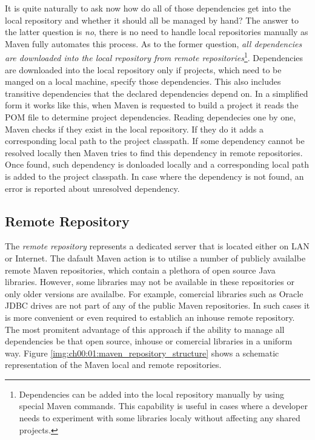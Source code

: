   It is quite naturally to ask now how do all of those dependencies get into the local repository and whether it should all be managed by hand?
  The answer to the latter question is \emph{no}, there is no need to handle local repositories manually as Maven fully automates this process.
  As to the former question, \emph{all dependencies are downloaded into the local repository from remote repositories}\footnote{
    Dependencies can be added into the local repository manually by using special Maven commands. 
    This capability is useful in cases where a developer needs to experiment with some libraries localy without affecting any shared projects.
  }.
  Dependencies are downloaded into the local repository only if projects, which need to be manged on a local machine, specify those dependencies.
  This also includes transitive dependencies that the declared dependencies depend on.
  In a simplified form it works like this, when Maven is requested to build a project it reads the POM file to determine project dependencies.
  Reading dependecies one by one, Maven checks if they exist in the local repository.
  If they do it adds a corresponding local path to the project classpath.
  If some dependency cannot be resolved locally then Maven tries to find this dependency in remote repositories.
  Once found, such dependency is donloaded locally and a corresponding local path is added to the project classpath.
  In case where the dependency is not found, an error is reported about unresolved dependency.

  \subsection*{Remote Repository}
  
  The \emph{remote repository} represents a dedicated server that is located either on LAN or Internet.
  The dafault Maven action is to utilise a number of publicly availalbe remote Maven repositories, which contain a plethora of open source Java libraries.
  However, some libraries may not be available in these repositories or only older versions are availalbe.
  For example, comercial libraries such as Oracle JDBC drives are not part of any of the public Maven repositories.
  In such cases it is more convenient or even required to establich an inhouse remote repository.
  The most promitent advantage of this approach if the ability to manage all dependencies be that open source, inhouse or comercial libraries in a uniform way.
  Figure \ref{img:ch00:01:maven_repository_structure} shows a schematic representation of the Maven local and remote repositories.

